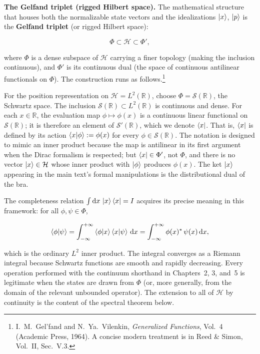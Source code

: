 \medskip\noindent\textbf{The Gelfand triplet (rigged Hilbert space).} The mathematical structure that houses both the normalizable state vectors and the idealizations $\ket{x}$, $\ket{p}$ is the \textbf{Gelfand triplet} (or rigged Hilbert space):
\begin{linenomath}
    \begin{equation}
        \Phi \subset \mathcal{H} \subset \Phi',
        \label{eq:gelfand-triplet}
    \end{equation}
\end{linenomath}
where $\Phi$ is a dense subspace of $\mathcal{H}$ carrying a finer topology (making the inclusion continuous), and $\Phi'$ is its continuous dual (the space of continuous antilinear functionals on $\Phi$). The construction runs as follows.\footnote{I.~M.~Gel'fand and N.~Ya.~Vilenkin, \emph{Generalized Functions}, Vol.~4 (Academic Press, 1964). A concise modern treatment is in Reed \& Simon, Vol.~II, Sec.~V.3.}

For the position representation on $\mathcal{H} = L^2(\mathbb{R})$, choose $\Phi = \mathcal{S}(\mathbb{R})$, the Schwartz space. The inclusion $\mathcal{S}(\mathbb{R}) \subset L^2(\mathbb{R})$ is continuous and dense. For each $x \in \mathbb{R}$, the evaluation map $\phi \mapsto \phi(x)$ is a continuous linear functional on $\mathcal{S}(\mathbb{R})$; it is therefore an element of $\mathcal{S}'(\mathbb{R})$, which we denote $\bra{x}$. That is, $\bra{x}$ is defined by its action $\braket{x|\phi} := \phi(x)$ for every $\phi \in \mathcal{S}(\mathbb{R})$. The notation is designed to mimic an inner product because the map is antilinear in its first argument when the Dirac formalism is respected; but $\bra{x} \in \Phi'$, not $\Phi$, and there is no vector $\ket{x} \in \mathcal{H}$ whose inner product with $\ket{\phi}$ produces $\phi(x)$. The ket $\ket{x}$ appearing in the main text's formal manipulations is the distributional dual of the bra.

The completeness relation $\int \mathrm{d} x\,\ket{x}\bra{x} = I$ acquires its precise meaning in this framework: for all $\phi,\psi \in \Phi$,
\begin{linenomath}
    \begin{equation}
        \braket{\phi|\psi} = \int_{-\infty}^{+\infty} \braket{\phi|x}\braket{x|\psi}\,\mathrm{d} x = \int_{-\infty}^{+\infty} \phi(x)^*\,\psi(x)\,\mathrm{d} x,
        \label{eq:resolution-rigorous}
    \end{equation}
\end{linenomath}
which is the ordinary $L^2$ inner product. The integral converges as a Riemann integral because Schwartz functions are smooth and rapidly decreasing. Every operation performed with the continuum shorthand in Chapters~2, 3, and~5 is legitimate when the states are drawn from $\Phi$ (or, more generally, from the domain of the relevant unbounded operator). The extension to all of $\mathcal{H}$ by continuity is the content of the spectral theorem below.

